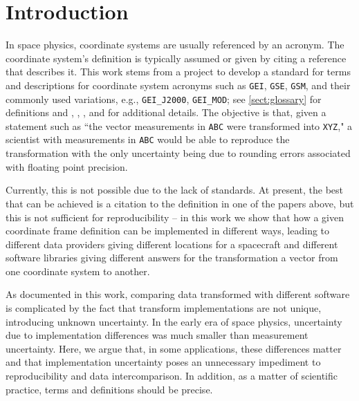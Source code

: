 \documentclass[draft]{agujournal2019}
\begin{document}



\section{Introduction}


In space physics, coordinate systems are usually referenced by an acronym. The coordinate system's definition is typically assumed or given by citing a reference that describes it. This work stems from a project to develop a standard for terms and descriptions for coordinate system acronyms such as \texttt{GEI}, \texttt{GSE}, \texttt{GSM}, and their commonly used variations, e.g., \texttt{GEI\_J2000}, \texttt{GEI\_MOD}; see \ref{sect:glossary} for definitions and , , , and  for additional details. The objective is that, given a statement such as ``the vector measurements in \texttt{ABC} were transformed into \texttt{XYZ}," a scientist with measurements in \texttt{ABC} would be able to reproduce the transformation with the only uncertainty being due to rounding errors associated with floating point precision.

Currently, this is not possible due to the lack of standards. At present, the best that can be achieved is a citation to the definition in one of the papers above, but this is not sufficient for reproducibility -- in this work we show that how a given coordinate frame definition can be implemented in different ways, leading to different data providers giving different locations for a spacecraft and different software libraries giving different answers for  the transformation a vector from one coordinate system to another.

As documented in this work, comparing data transformed with different software is complicated by the fact that transform implementations are not unique, introducing unknown uncertainty. In the early era of space physics, uncertainty due to implementation differences was much smaller than measurement uncertainty. Here, we argue that, in some applications, these differences matter and that implementation uncertainty poses an unnecessary impediment to reproducibility and data intercomparison. In addition, as a matter of scientific practice, terms and definitions should be precise.
\end{document}
